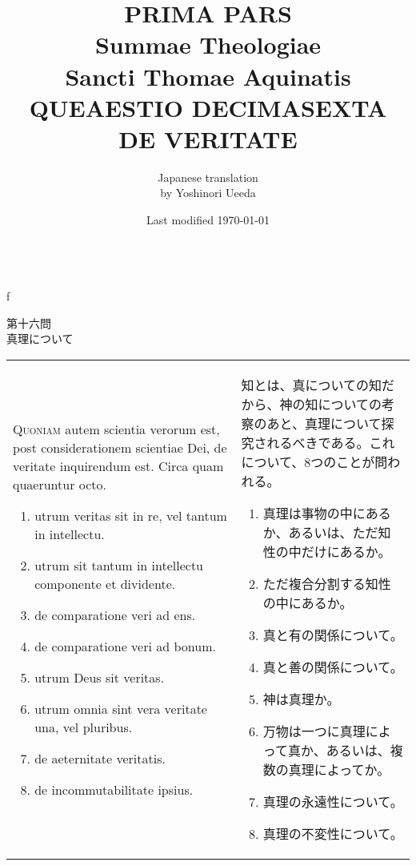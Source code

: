 \\f\documentclass[10pt]{jsarticle} %
\title{{\bf PRIMA PARS}\\{\HUGE Summae Theologiae}\\Sancti Thomae
Aquinatis\\{\sffamily QUEAESTIO DECIMASEXTA}\\DE VERITATE}
\author{Japanese translation\\by Yoshinori {\sc Ueeda}}
\date{Last modified \today}
\begin{document}
\maketitle
\pagestyle{fancy}

\begin{center}
{\Large 第十六問\\真理について}
\end{center}

\begin{longtable}{p{21em}p{21em}}
{\huge Q}{\scshape uoniam} autem scientia verorum est, post
 considerationem scientiae Dei, de veritate inquirendum est. Circa quam
 quaeruntur octo. 
\begin{enumerate}
 \item utrum veritas sit in re, vel tantum in intellectu.
 \item utrum sit tantum in intellectu componente et dividente.
 \item de comparatione veri ad ens.
 \item de comparatione veri ad bonum.
 \item utrum Deus sit veritas.
 \item utrum omnia sint vera veritate una, vel pluribus.
 \item de aeternitate veritatis.
 \item de incommutabilitate ipsius.
\end{enumerate}

&

知とは、真についての知だから、神の知についての考察のあと、真理について探
 究されるべきである。これについて、8つのことが問われる。
\begin{enumerate}
 \item 真理は事物の中にあるか、あるいは、ただ知性の中だけにあるか。
 \item ただ複合分割する知性の中にあるか。
 \item 真と有の関係について。
 \item 真と善の関係について。
 \item 神は真理か。
 \item 万物は一つに真理によって真か、あるいは、複数の真理によってか。
 \item 真理の永遠性について。
 \item 真理の不変性について。
\end{enumerate}

\end{longtable}


\newpage
\end{document}
